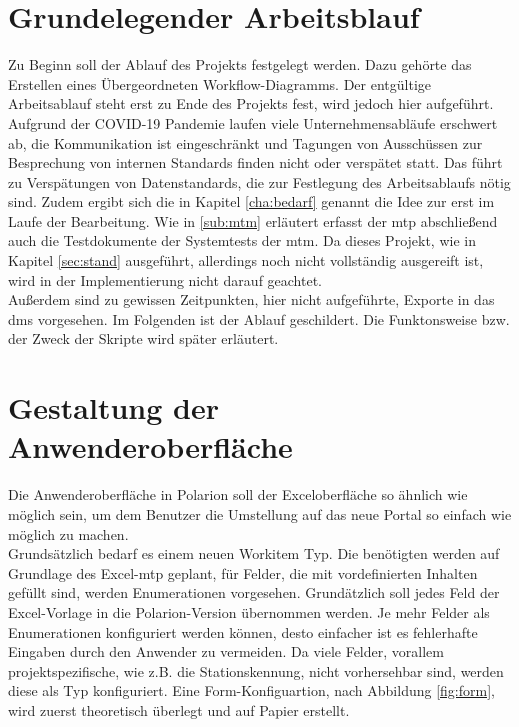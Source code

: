 \section{Grundelegender Arbeitsblauf}
\label{sec:ablauf}
Zu Beginn soll der Ablauf des Projekts festgelegt werden. Dazu gehörte das Erstellen eines Übergeordneten Workflow-Diagramms. Der entgültige Arbeitsablauf steht erst zu Ende des Projekts fest, wird jedoch hier aufgeführt. Aufgrund der COVID-19 Pandemie laufen viele Unternehmensabläufe erschwert ab, die Kommunikation ist eingeschränkt und Tagungen von Ausschüssen zur Besprechung von internen Standards finden nicht oder verspätet statt. Das führt zu Verspätungen von Datenstandards, die zur Festlegung des Arbeitsablaufs nötig sind.
Zudem ergibt sich die in Kapitel \ref{cha:bedarf} genannt die Idee zur  erst im Laufe der Bearbeitung.
Wie in \ref{sub:mtm} erläutert erfasst der \ac{mtp} abschließend auch die Testdokumente der Systemtests der \ac{mtm}. Da dieses Projekt, wie in Kapitel \ref{sec:stand} ausgeführt, allerdings noch nicht vollständig ausgereift ist, wird in der Implementierung nicht darauf geachtet.\\
Außerdem sind zu gewissen Zeitpunkten, hier nicht aufgeführte, Exporte in das \ac{dms} vorgesehen.
\newpage
Im Folgenden ist der Ablauf geschildert. Die Funktonsweise bzw. der Zweck der Skripte wird später erläutert.

\section{Gestaltung der Anwenderoberfläche}
\label{sec:gest}
Die Anwenderoberfläche in Polarion soll der Exceloberfläche so ähnlich wie möglich sein, um dem Benutzer die Umstellung auf das neue Portal so einfach wie möglich zu machen.\\
Grundsätzlich bedarf es einem neuen Workitem Typ.
Die benötigten  werden auf Grundlage des Excel-\ac{mtp} geplant, für Felder, die mit vordefinierten Inhalten gefüllt sind, werden Enumerationen vorgesehen. Grundätzlich soll jedes Feld der Excel-Vorlage in die Polarion-Version übernommen werden. Je mehr Felder als Enumerationen konfiguriert werden können, desto einfacher ist es fehlerhafte Eingaben durch den Anwender zu vermeiden. Da viele Felder, vorallem projektspezifische, wie z.B. die Stationskennung, nicht vorhersehbar sind, werden diese als Typ  konfiguriert.
Eine Form-Konfiguartion, nach Abbildung \ref{fig:form}, wird zuerst theoretisch überlegt und auf Papier erstellt.
